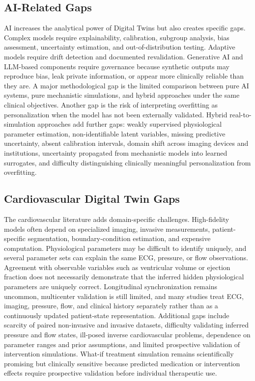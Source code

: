 \subsection{AI-Related Gaps}
AI increases the analytical power of Digital Twins but also creates specific gaps. Complex models require explainability, calibration, subgroup analysis, bias assessment, uncertainty estimation, and out-of-distribution testing. Adaptive models require drift detection and documented revalidation. Generative AI and LLM-based components require governance because synthetic outputs may reproduce bias, leak private information, or appear more clinically reliable than they are. A major methodological gap is the limited comparison between pure AI systems, pure mechanistic simulations, and hybrid approaches under the same clinical objectives. Another gap is the risk of interpreting overfitting as personalization when the model has not been externally validated. Hybrid real-to-simulation approaches add further gaps: weakly supervised physiological parameter estimation, non-identifiable latent variables, missing predictive uncertainty, absent calibration intervals, domain shift across imaging devices and institutions, uncertainty propagated from mechanistic models into learned surrogates, and difficulty distinguishing clinically meaningful personalization from overfitting.

\subsection{Cardiovascular Digital Twin Gaps}
The cardiovascular literature adds domain-specific challenges. High-fidelity models often depend on specialized imaging, invasive measurements, patient-specific segmentation, boundary-condition estimation, and expensive computation. Physiological parameters may be difficult to identify uniquely, and several parameter sets can explain the same ECG, pressure, or flow observations. Agreement with observable variables such as ventricular volume or ejection fraction does not necessarily demonstrate that the inferred hidden physiological parameters are uniquely correct. Longitudinal synchronization remains uncommon, multicenter validation is still limited, and many studies treat ECG, imaging, pressure, flow, and clinical history separately rather than as a continuously updated patient-state representation. Additional gaps include scarcity of paired non-invasive and invasive datasets, difficulty validating inferred pressure and flow states, ill-posed inverse cardiovascular problems, dependence on parameter ranges and prior assumptions, and limited prospective validation of intervention simulations. What-if treatment simulation remains scientifically promising but clinically sensitive because predicted medication or intervention effects require prospective validation before individual therapeutic use.

